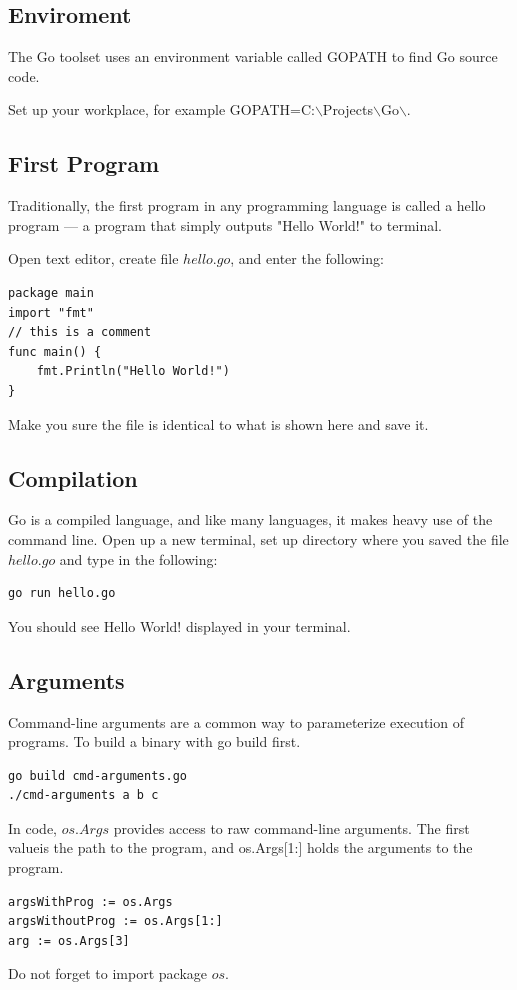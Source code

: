 \documentclass[
  digital, %
  notable,   %
  lof,     %
  lot,     %
]{fithesis3}
\begin{document}
\subsection{Enviroment}
The Go toolset uses an environment variable called GOPATH to find Go source code. 

Set up your workplace, for example GOPATH=C:$\backslash$Projects$\backslash$Go$\backslash$.

\subsection{First Program}
Traditionally, the first program in any programming language is called a
hello program — a program that simply outputs "Hello World!" to terminal.

Open text editor, create file $hello.go$, and enter the following:
\begin{lstlisting}
package main
import "fmt"
// this is a comment
func main() {
	fmt.Println("Hello World!")
}
\end{lstlisting}
Make you sure the file is identical to what is shown here and save it.

\subsection{Compilation}
Go is a compiled language, and like many languages, it makes heavy use of the command
line. Open up a new terminal, set up directory where you saved the file $hello.go$ and type in 
the following:
\begin{lstlisting}
go run hello.go
\end{lstlisting}
You should see Hello World! displayed in your terminal.

\subsection{Arguments}
Command-line arguments are a common way to parameterize execution of programs. To build a 
binary with go build first.
\begin{lstlisting}
go build cmd-arguments.go
./cmd-arguments a b c
\end{lstlisting}
In code, $os.Args$ provides access to raw command-line arguments. The first valueis the path 
to the program, and os.Args[1:] holds the arguments to the program.
\begin{lstlisting}
argsWithProg := os.Args
argsWithoutProg := os.Args[1:]
arg := os.Args[3]
\end{lstlisting}
Do not forget to import package $os$.
\end{document}
